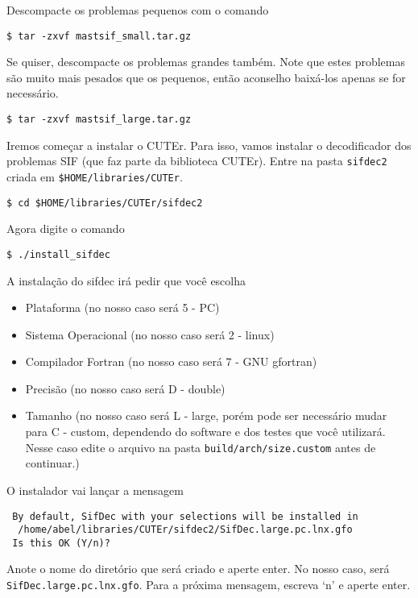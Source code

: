 \documentclass[letterpaper,11pt]{article}
\numberwithin{equation}{section}
\begin{document}
Descompacte os problemas pequenos com o comando
\begin{verbatim}
$ tar -zxvf mastsif_small.tar.gz 
\end{verbatim}
Se quiser, descompacte os problemas grandes também. Note que estes problemas são
muito mais pesados que os pequenos, então aconselho baixá-los apenas se for necessário.
\begin{verbatim}
$ tar -zxvf mastsif_large.tar.gz
\end{verbatim}
Iremos começar a instalar o CUTEr. Para isso, vamos instalar o decodificador
dos problemas SIF (que faz parte da biblioteca CUTEr).
Entre na pasta \verb+sifdec2+ criada em \verb+$HOME/libraries/CUTEr+.
\begin{verbatim}
$ cd $HOME/libraries/CUTEr/sifdec2
\end{verbatim}
Agora digite o comando
\begin{verbatim}
$ ./install_sifdec
\end{verbatim}
A instalação do sifdec irá pedir que você escolha
\begin{itemize}
 \item Plataforma (no nosso caso será 5 - PC)
 \item Sistema Operacional (no nosso caso será 2 - linux)
 \item Compilador Fortran (no nosso caso será 7 - GNU gfortran)
 \item Precisão (no nosso caso será D - double)
 \item Tamanho (no nosso caso será L - large, porém pode ser necessário mudar para C - custom,
dependendo do software e dos testes que você utilizará. Nesse caso edite o arquivo na pasta
\verb+build/arch/size.custom+ antes de continuar.)
\end{itemize}
O instalador vai lançar a mensagem
\begin{verbatim}
 By default, SifDec with your selections will be installed in
  /home/abel/libraries/CUTEr/sifdec2/SifDec.large.pc.lnx.gfo
 Is this OK (Y/n)?
\end{verbatim}
Anote o nome do diretório que será criado e aperte enter. No nosso caso, será \\
 \verb+SifDec.large.pc.lnx.gfo+. Para a próxima mensagem, escreva `n' e aperte enter.
\end{document}

